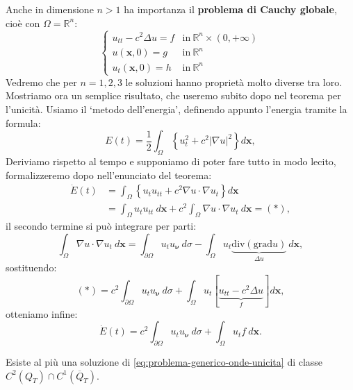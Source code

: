 \documentclass[10pt,a4paper,twoside,openright]{book}
\newcommand{\x}{\mathbf{x}}
\begin{document}
Anche in dimensione $n >1$ ha importanza il \textbf{problema di Cauchy globale}, cioè con $\Omega =\mathbb{R}^{n}$:
\begin{equation}
	\begin{cases}
		u_{tt} -c^{2} \Delta u=f & \text{in} \ \mathbb{R}^{n} \times ( 0,+\infty ) \\
		u(\x ,0) =g      & \text{in} \ \mathbb{R}^{n}                      \\
		u_{t}(\x ,0) =h  & \text{in} \ \mathbb{R}^{n}                      
	\end{cases}
	\label{eq:pcg-onde-unicita}
\end{equation}
Vedremo che per $n=1,2,3$ le soluzioni hanno proprietà molto diverse tra loro. Mostriamo ora un semplice risultato, che useremo subito dopo nel teorema per l'unicità. Usiamo il `metodo dell'energia', definendo appunto l'energia tramite la formula:
\begin{equation}
	E( t) =\frac{1}{2}\int _{\Omega }\left\{u_{t}^{2} +c^{2}| \nabla u| ^{2}\right\} d\x ,
\end{equation}
Deriviamo rispetto al tempo e supponiamo di poter fare tutto in modo lecito, formalizzeremo dopo nell'enunciato del teorema:
\begin{align*}
	\dot{E}( t) & =\int _{\Omega }\left\{u_{t} u_{tt} +c^{2} \nabla u\cdotp \nabla u_{t}\right\} d\x                          \\
	            & =\int _{\Omega } u_{t} u_{tt} \ d\x +c^{2}\int _{\Omega } \nabla u\cdotp \nabla u_{t} \ d\x =( *) , 
\end{align*}
il secondo termine si può integrare per parti:
\begin{equation*}
	\int _{\Omega } \nabla u\cdotp \nabla u_{t} \ d\x =\int _{\partial \Omega } u_{t} u_{\bm{\nu }} \ d\sigma -\int _{\Omega } u_{t}\underbrace{\mathrm{div}(\mathrm{grad} u)}_{\Delta u} \ d\x ,
\end{equation*}
sostituendo:
\begin{equation*}
	( *) =c^{2}\int _{\partial \Omega } u_{t} u_{\bm{\nu }} \ d\sigma +\int _{\Omega } u_{t}[\underbrace{u_{tt} -c^{2} \Delta u}_{f}] d\x ,
\end{equation*}
otteniamo infine:
\begin{equation}
	\dot{E}( t) =c^{2}\int _{\partial \Omega } u_{t} u_{\bm{\nu }} \ d\sigma +\int _{\Omega } u_{t} f\ d\x .
	\label{eq:onde-derivata-energia}
\end{equation}
\begin{theorem}
	Esiste al più una soluzione di \eqref{eq:problema-generico-onde-unicita} di classe $C^{2}( Q_{T}) \cap C^{1}(\overline{Q}_{T})$.
\end{theorem}
\end{document}
